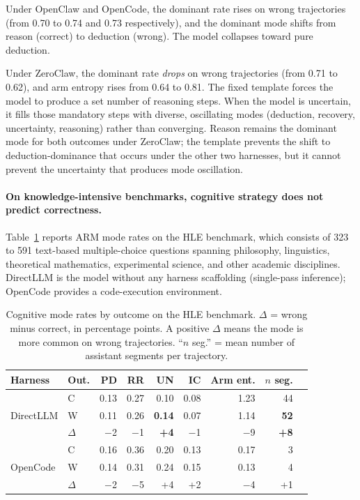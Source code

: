 Under OpenClaw and OpenCode, the dominant rate rises on wrong trajectories
(from 0.70 to 0.74 and 0.73 respectively), and the dominant mode shifts
from reason (correct) to deduction (wrong).
The model collapses toward pure deduction.

Under ZeroClaw, the dominant rate \emph{drops} on wrong trajectories (from
0.71 to 0.62), and arm entropy rises from 0.64 to 0.81.
The fixed template forces the model to produce a set number of reasoning
steps.
When the model is uncertain, it fills those mandatory steps with diverse,
oscillating modes (deduction, recovery, uncertainty, reasoning) rather than
converging.
Reason remains the dominant mode for both outcomes under ZeroClaw; the
template prevents the shift to deduction-dominance that occurs under the
other two harnesses, but it cannot prevent the uncertainty that produces
mode oscillation.

\paragraph{On knowledge-intensive benchmarks, cognitive strategy does not
predict correctness.}

Table~\ref{tab:arm-hle-nondiscriminative} reports ARM mode rates on the HLE
benchmark, which consists of 323 to 591 text-based multiple-choice questions
spanning philosophy, linguistics, theoretical mathematics, experimental
science, and other academic disciplines.
DirectLLM is the model without any harness scaffolding (single-pass
inference); OpenCode provides a code-execution environment.

\begin{table}[t]
\centering
\small
\caption{%
  Cognitive mode rates by outcome on the HLE benchmark.
  $\Delta$ = wrong minus correct, in percentage points.
  A positive $\Delta$ means the mode is more common on wrong trajectories.
  ``$n$ seg.'' = mean number of assistant segments per trajectory.
}
\label{tab:arm-hle-nondiscriminative}
\setlength{\tabcolsep}{3pt}
\begin{tabular}{llrrrrrrr}
\toprule
Harness & Out. & PD & RR & UN & IC & Arm ent. & $n$ seg. \\
\midrule
\multirow{3}{*}{DirectLLM}
  & C      & 0.13 & 0.27 & 0.10 & 0.08 & 1.23 & 44 \\
  & W      & 0.11 & 0.26 & \textbf{0.14} & 0.07 & 1.14 & \textbf{52} \\
  & $\Delta$ & $-$2 & $-$1  & \textbf{+4}  & $-$1  & $-$9  & \textbf{+8} \\
\midrule
\multirow{3}{*}{OpenCode}
  & C      & 0.16 & 0.36 & 0.20 & 0.13 & 0.17 & 3 \\
  & W      & 0.14 & 0.31 & 0.24 & 0.15 & 0.13 & 4 \\
  & $\Delta$ & $-$2 & $-$5  & +4    & +2    & $-$4  & +1 \\
\bottomrule
\end{tabular}
\end{table}

